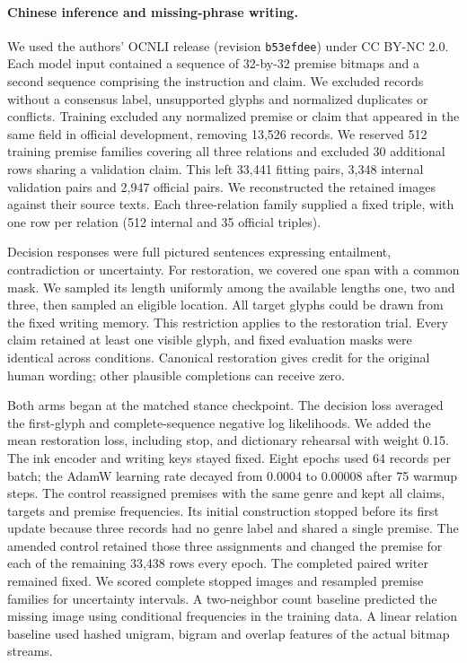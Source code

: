 \paragraph{Chinese inference and missing-phrase writing.}
We used the authors' OCNLI release (revision \texttt{b53efdee}) under CC BY-NC 2.0\cite{ocnli}. Each model input contained a sequence of 32-by-32 premise bitmaps and a second sequence comprising the instruction and claim. We excluded records without a consensus label, unsupported glyphs and normalized duplicates or conflicts. Training excluded any normalized premise or claim that appeared in the same field in official development, removing 13,526 records. We reserved 512 training premise families covering all three relations and excluded 30 additional rows sharing a validation claim. This left 33,441 fitting pairs, 3,348 internal validation pairs and 2,947 official pairs. We reconstructed the retained images against their source texts. Each three-relation family supplied a fixed triple, with one row per relation (512 internal and 35 official triples).

Decision responses were full pictured sentences expressing entailment, contradiction or uncertainty. For restoration, we covered one span with a common mask. We sampled its length uniformly among the available lengths one, two and three, then sampled an eligible location. All target glyphs could be drawn from the fixed writing memory. This restriction applies to the restoration trial. Every claim retained at least one visible glyph, and fixed evaluation masks were identical across conditions. Canonical restoration gives credit for the original human wording; other plausible completions can receive zero.

Both arms began at the matched stance checkpoint. The decision loss averaged the first-glyph and complete-sequence negative log likelihoods. We added the mean restoration loss, including stop, and dictionary rehearsal with weight 0.15. The ink encoder and writing keys stayed fixed. Eight epochs used 64 records per batch; the AdamW learning rate decayed from 0.0004 to 0.00008 after 75 warmup steps. The control reassigned premises with the same genre and kept all claims, targets and premise frequencies. Its initial construction stopped before its first update because three records had no genre label and shared a single premise. The amended control retained those three assignments and changed the premise for each of the remaining 33,438 rows every epoch. The completed paired writer remained fixed. We scored complete stopped images and resampled premise families for uncertainty intervals. A two-neighbor count baseline predicted the missing image using conditional frequencies in the training data. A linear relation baseline used hashed unigram, bigram and overlap features of the actual bitmap streams.

